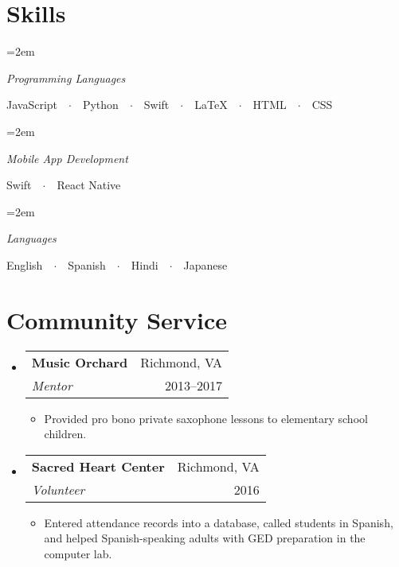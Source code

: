 \documentclass{article}
\makeatletter
\newcommand{\resumeSubHeadingListStart}{\begin{itemize}[leftmargin=*]}
\newcommand{\resumeSubHeadingListEnd}{\end{itemize}}
\newcommand{\workSubheading}[5]{
\item
\begin{tabular*}{\textwidth}{l@{\extracolsep{\fill}}r}
\textbf{\large#1} & #2 \\
\textit{#3} & #4
\end{tabular*}
\vspace{-1em}
\begin{itemize}
\item #5
\end{itemize}
\vspace{0.25em}
}
\newlength{\spacebox}
\newcommand{\skillEntry}[2]{
    \noindent\hangindent=2em\hangafter=0 %
    \parbox{\spacebox}{        %
    \raggedright{\textit{#1}}}               %
    \hspace{1.5em} #2 \par \vspace{0.75em}}    %
\makeatother
\begin{document}

\section{Skills}

\skillEntry{Programming Languages}
{JavaScript\ \ $\cdotp$\ \ Python\ \ $\cdotp$\ \ Swift\ \ $\cdotp$\ \ \LaTeX\ \ $\cdotp$\ \ HTML\ \ $\cdotp$\ \ CSS}

\skillEntry{Mobile App Development}
{Swift\ \ $\cdotp$\ \ React Native}

\skillEntry{Languages}
{English\ \ $\cdotp$\ \ Spanish\ \ $\cdotp$\ \ Hindi\ \ $\cdotp$\ \ Japanese}



\section{Community Service}

\resumeSubHeadingListStart
    \workSubheading{Music Orchard}{Richmond, VA}
    {Mentor}{2013--2017}
    {Provided pro bono private saxophone lessons to elementary school children.}
    
    \workSubheading{Sacred Heart Center}{Richmond, VA}
    {Volunteer}{2016}
    {Entered attendance records into a database, called students in Spanish, and helped Spanish-speaking adults with GED preparation in the computer lab.}
\resumeSubHeadingListEnd
\end{document}
